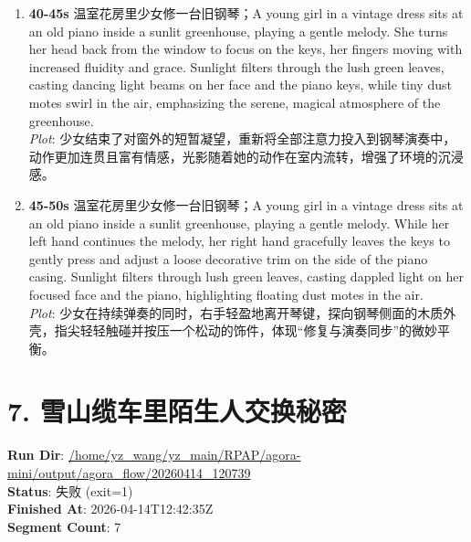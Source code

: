 \documentclass[11pt,a4paper]{article}
\begin{document}
\begin{enumerate}
\item \textbf{40-45s} 温室花房里少女修一台旧钢琴；A young girl in a vintage dress sits at an old piano inside a sunlit greenhouse, playing a gentle melody. She turns her head back from the window to focus on the keys, her fingers moving with increased fluidity and grace. Sunlight filters through the lush green leaves, casting dancing light beams on her face and the piano keys, while tiny dust motes swirl in the air, emphasizing the serene, magical atmosphere of the greenhouse.\\\newline \textit{Plot}: 少女结束了对窗外的短暂凝望，重新将全部注意力投入到钢琴演奏中，动作更加连贯且富有情感，光影随着她的动作在室内流转，增强了环境的沉浸感。
\item \textbf{45-50s} 温室花房里少女修一台旧钢琴；A young girl in a vintage dress sits at an old piano inside a sunlit greenhouse, playing a gentle melody. While her left hand continues the melody, her right hand gracefully leaves the keys to gently press and adjust a loose decorative trim on the side of the piano casing. Sunlight filters through lush green leaves, casting dappled light on her focused face and the piano, highlighting floating dust motes in the air.\\\newline \textit{Plot}: 少女在持续弹奏的同时，右手轻盈地离开琴键，探向钢琴侧面的木质外壳，指尖轻轻触碰并按压一个松动的饰件，体现“修复与演奏同步”的微妙平衡。
\end{enumerate}

\section{7. 雪山缆车里陌生人交换秘密}
\textbf{Run Dir}: \url{/home/yz\_wang/yz\_main/RPAP/agora-mini/output/agora\_flow/20260414\_120739}\\
\textbf{Status}: 失败 (exit=1)\\
\textbf{Finished At}: 2026-04-14T12:42:35Z\\
\textbf{Segment Count}: 7
\end{document}
